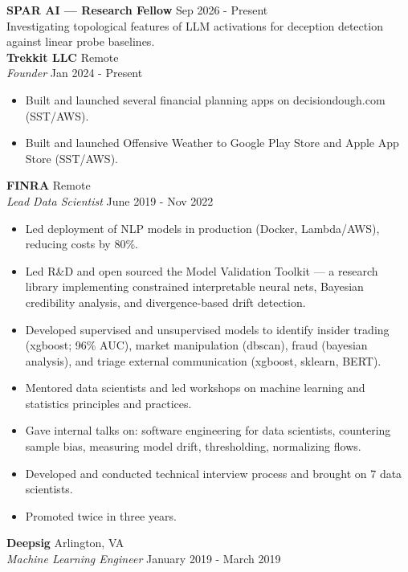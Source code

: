 \documentclass[a4paper]{article}
\begin{document}
\textbf{SPAR AI — Research Fellow} \hfill Sep 2026 - Present\\
Investigating topological features of LLM activations for deception detection against linear probe baselines.\\
\textbf{Trekkit LLC} \hfill Remote\\
\textit{Founder} \hfill Jan 2024 - Present\\
\vspace{-1mm}
\begin{itemize} \itemsep 1pt
	\item Built and launched several financial planning apps on decisiondough.com (SST/AWS).
	\item Built and launched Offensive Weather to Google Play Store and Apple App Store (SST/AWS).
\end{itemize}
\textbf{FINRA} \hfill Remote\\
\textit{Lead Data Scientist} \hfill June 2019 - Nov 2022\\
\vspace{-1mm}
\begin{itemize} \itemsep 1pt
	\item Led deployment of NLP models in production (Docker, Lambda/AWS), reducing costs by 80\%.
	\item Led R\&D and open sourced the Model Validation Toolkit — a research library implementing constrained interpretable neural nets, Bayesian credibility analysis, and divergence-based drift detection.
	\item Developed supervised and unsupervised models to identify insider trading (xgboost; 96\% AUC), market manipulation (dbscan), fraud (bayesian analysis), and triage external communication (xgboost, sklearn, BERT).
	\item Mentored data scientists and led workshops on machine learning and statistics principles and practices.
	\item Gave internal talks on: software engineering for data scientists, countering sample bias, measuring model drift, thresholding, normalizing flows.
	\item Developed and conducted technical interview process and brought on 7 data scientists.
	\item Promoted twice in three years.
\end{itemize}
\textbf{Deepsig} \hfill Arlington, VA\\
\textit{Machine Learning Engineer} \hfill January 2019 - March 2019\\
\vspace{-1mm}
\end{document}
